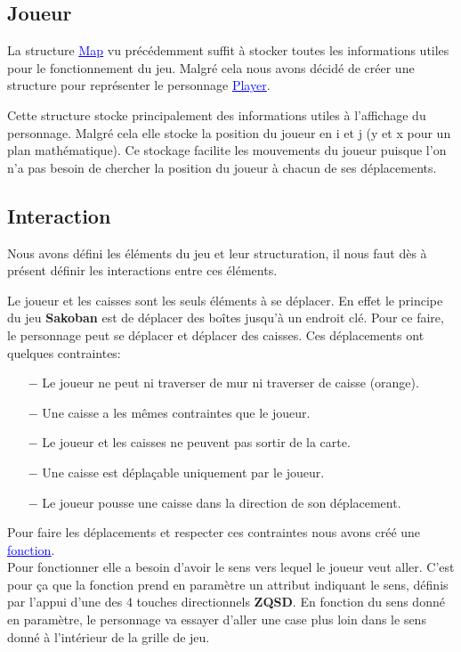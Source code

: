 \documentclass[french, 12pt]{article}
\begin{document}
   \subsection{Joueur}
       La structure \href{../doc/html/struct_map.html}{\textcolor{blue}{\underline{Map}}} vu précédemment suffit à stocker toutes les informations utiles pour le fonctionnement du jeu. Malgré cela nous avons décidé de créer une structure pour représenter le personnage \href{../doc/html/struct_player.html}{\textcolor{blue}{\underline{Player}}}.


       Cette structure stocke principalement des informations utiles à l'affichage du personnage. Malgré cela elle stocke la position du joueur en i et j (y et x pour un plan mathématique). Ce stockage facilite les mouvements du joueur puisque l'on n'a pas besoin de chercher la position du joueur à chacun de ses déplacements.


   \subsection{Interaction}
       Nous avons défini les éléments du jeu et leur structuration, il nous faut dès à présent définir les interactions entre ces éléments.


       Le joueur et les caisses sont les seuls éléments à se déplacer. En effet le principe du jeu \textbf{Sakoban} est de déplacer des boîtes jusqu'à un endroit clé. Pour ce faire, le personnage peut se déplacer et déplacer des caisses. Ces déplacements ont quelques contraintes:


       \begin{itemize}
           \item[$-$] Le joueur ne peut ni traverser de mur ni traverser de caisse (orange).
           \item[$-$] Une caisse a les mêmes contraintes que le joueur.
           \item[$-$] Le joueur et les caisses ne peuvent pas sortir de la carte.
           \item[$-$] Une caisse est déplaçable uniquement par le joueur.
           \item[$-$] Le joueur pousse une caisse dans la direction de son déplacement.
       \end{itemize}


       Pour faire les déplacements et respecter ces contraintes nous avons créé une \href{../doc/html/move_8h.html}{\textcolor{blue}{\underline{fonction}}}. \\
       Pour fonctionner elle a besoin d'avoir le sens vers lequel le joueur veut aller. C'est pour ça que la fonction prend en paramètre un attribut indiquant le sens, définis par l'appui d'une des 4 touches directionnels \textbf{ZQSD}. En fonction du sens donné en paramètre, le personnage va essayer d'aller une case plus loin dans le sens donné à l'intérieur de la grille de jeu.\\
\end{document}
